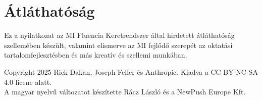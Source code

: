 \documentclass[a4paper, 11pt]{article}
\begin{document}
\section*{Átláthatóság}
Ez a nyilatkozat az MI Fluencia Keretrendszer által hirdetett átláthatóság szellemében készült, valamint elismerve az MI fejlődő szerepét az oktatási tartalomfejlesztésben és más kreatív és szellemi munkában.

\vspace{\fill}
\begin{center}
    \small{Copyright 2025 Rick Dakan, Joseph Feller és Anthropic. Kiadva a CC BY-NC-SA 4.0 licenc alatt.\\A magyar nyelvű változatot készítette Rácz László és a NewPush Europe Kft.}
\end{center}
\end{document}
